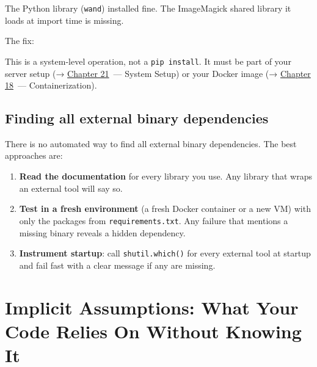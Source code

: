 \noindent{}The Python library (\texttt{wand}) installed fine. The ImageMagick shared library it loads at import time is missing.

The fix:

\begin{codebox}[short]

\begin{Shaded}
\begin{Highlighting}[]
\end{Highlighting}
\end{Shaded}

\end{codebox}

\noindent{}This is a system-level operation, not a \texttt{pip\ install}. It must be part of your server setup (→ \hyperref[ch:21-system-setup]{Chapter 21}~--- System Setup) or your Docker image (→ \hyperref[ch:18-containerization]{Chapter 18}~--- Containerization).

\subsection*{Finding all external binary dependencies}\label{08-hidden-dependencies:finding-all-external-binary-dependencies}

There is no automated way to find all external binary dependencies. The best approaches are:

\begin{enumerate}
\def\labelenumi{\arabic{enumi}.}
\tightlist
\item
  \textbf{Read the documentation} for every library you use. Any library that wraps an external tool will say so.
\item
  \textbf{Test in a fresh environment} (a fresh Docker container or a new VM) with only the packages from \texttt{requirements.txt}. Any failure that mentions a missing binary reveals a hidden dependency.
\item
  \textbf{Instrument startup}: call \texttt{shutil.which()} for every external tool at startup and fail fast with a clear message if any are missing.
\end{enumerate}

\setcounter{section}{3}
\section{Implicit Assumptions: What Your Code Relies On Without Knowing It}\label{08-hidden-dependencies:84-implicit-assumptions-what-your-code-relies-on-without-knowing-it}

